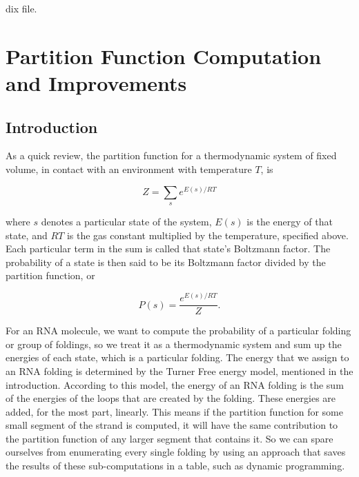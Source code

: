 dix file.
\chapter{Partition Function Computation and Improvements}
\section{Introduction}

As a quick review, the partition function for a thermodynamic system
of fixed volume, in contact with an environment with temperature $T$,
is

\begin{equation} Z = \sum_s e^{E(s)/ RT } \end{equation}

where $s$ denotes a particular state of the system, $E(s)$ is the
energy of that state, and $RT$ is the gas constant multiplied by the
temperature, specified above. Each particular term in the sum is
called that state's Boltzmann factor. The probability of a state is
then said to be its Boltzmann factor divided by the partition
function, or

\begin{equation} P(s) = \frac{e^{E(s)/RT}}{Z}.  \end{equation}

For an RNA molecule, we want to compute the probability of a
particular folding or group of foldings, so we treat it as a
thermodynamic system and sum up the energies of each state, which is a
particular folding. The energy that we assign to an RNA folding is
determined by the Turner Free energy model, mentioned in the
introduction. According to this model, the energy of an RNA folding is
the sum of the energies of the loops that are created by the
folding. These energies are added, for the most part, linearly. This
means if the partition function for some small segment of the strand
is computed, it will have the same contribution to the partition
function of any larger segment that contains it. So we can spare
ourselves from enumerating every single folding by using an approach
that saves the results of these sub-computations in a table, such as
dynamic programming.

